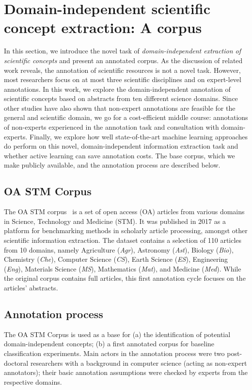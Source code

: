 \documentclass[runningheads]{llncs}
\begin{document}
\section{Domain-independent scientific concept extraction: A corpus}
In this section, we introduce the novel task of \textit{domain-independent extraction of scientific concepts} and present an annotated corpus. 
As the discussion of related work reveals, the annotation of scientific resources is not a novel task. However, most researchers focus on at most three scientific disciplines and on expert-level annotations. 
In this work, we explore the domain-independent annotation of scientific concepts based on abstracts from ten different science domains. Since other studies have also shown that non-expert annotations are feasible for the general and scientific domain, we go for a cost-efficient middle course: annotations of non-experts experienced in the annotation task and consultation with domain-experts.
Finally, we explore how well state-of-the-art machine learning approaches do perform on this novel, domain-independent information extraction task and whether active learning can save annotation costs.
The base corpus, which we make publicly available, and the annotation process are described below. 

\subsection{OA STM Corpus}
\label{sec:stm_corpus}
The OA STM corpus~\cite{OASTM} is a set of open access (OA) articles from various domains in Science, Technology and Medicine (STM). It was published in 2017 as a platform for benchmarking methods in scholarly article processing, amongst other scientific information extraction. The dataset contains a selection of 110 articles from 10 domains, namely Agriculture (\textit{Agr}), Astronomy (\textit{Ast}), Biology (\textit{Bio}), Chemistry (\textit{Che}), Computer Science (\textit{CS}), Earth Science (\textit{ES}), Engineering (\textit{Eng}), Materials Science (\textit{MS}), Mathematics (\textit{Mat}), and Medicine (\textit{Med}).
While the original corpus contains full articles, this first annotation cycle focuses on the articles' abstracts.


\subsection{Annotation process}
The OA STM Corpus is used as a base for (a) the identification of potential domain-independent concepts; (b) a first annotated corpus for baseline classification experiments. 
Main actors in the annotation process were two post-doctoral researchers with a background in computer science (acting as non-expert annotators); their basic annotation assumptions were checked by experts from the respective domains. 
\end{document}
